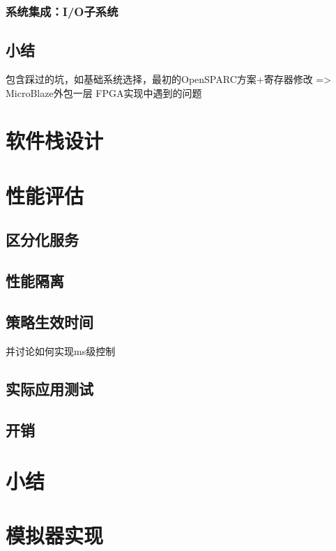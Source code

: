 \subsubsection*{系统集成：I/O子系统}


\subsection{小结}
包含踩过的坑，如基础系统选择，最初的OpenSPARC方案+寄存器修改 => MicroBlaze外包一层
FPGA实现中遇到的问题


\section{软件栈设计}



\section{性能评估}

\subsection{区分化服务}

\subsection{性能隔离}

\subsection{策略生效时间}

并讨论如何实现ms级控制

\subsection{实际应用测试}

\subsection{开销}


\section{小结}



\section{模拟器实现}
